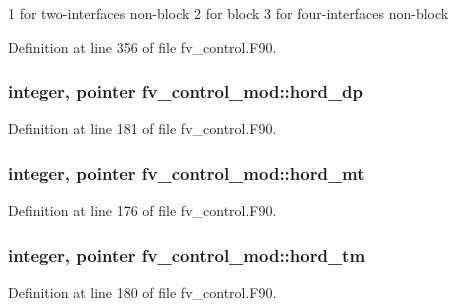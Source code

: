 1 for two-\/interfaces non-\/block 2 for block 3 for four-\/interfaces non-\/block 



Definition at line 356 of file fv\-\_\-control.\-F90.

\subsubsection[{hord\-\_\-dp}]{\setlength{\rightskip}{0pt plus 5cm}integer, pointer fv\-\_\-control\-\_\-mod\-::hord\-\_\-dp\hspace{0.3cm}{\ttfamily [private]}}\label{classfv__control__mod_ab43356c6c0ba965bb6e2c626c2d6b3a7}


Definition at line 181 of file fv\-\_\-control.\-F90.

\subsubsection[{hord\-\_\-mt}]{\setlength{\rightskip}{0pt plus 5cm}integer, pointer fv\-\_\-control\-\_\-mod\-::hord\-\_\-mt\hspace{0.3cm}{\ttfamily [private]}}\label{classfv__control__mod_a9673087af927980ad41bce4c63ff0420}


Definition at line 176 of file fv\-\_\-control.\-F90.

\subsubsection[{hord\-\_\-tm}]{\setlength{\rightskip}{0pt plus 5cm}integer, pointer fv\-\_\-control\-\_\-mod\-::hord\-\_\-tm\hspace{0.3cm}{\ttfamily [private]}}\label{classfv__control__mod_a1032a6ad00034e6a75dd9d652f8b8fb0}


Definition at line 180 of file fv\-\_\-control.\-F90.

